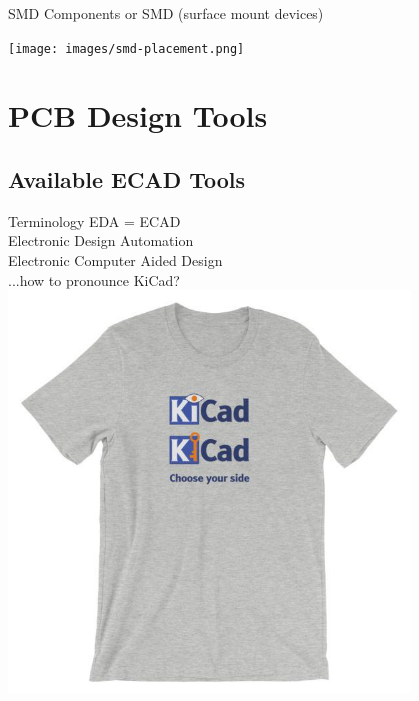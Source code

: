 \documentclass{beamer}
\begin{document}
\begin{frame}{SMD Components}
  or SMD (surface mount devices)\\
  \begin{center}
    \texttt{[image: images/smd-placement.png]}
  \end{center}
\end{frame}


\section{PCB Design Tools}

\subsection{Available ECAD Tools}

\begin{frame}{Terminology}
  EDA = ECAD\\
  Electronic Design Automation\\
  Electronic Computer Aided Design\\
  \pause
  \vspace{1cm}
  ...how to pronounce KiCad?\\
  \pause
  \includegraphics[width=0.8\textwidth]{images/kicad-pronounce.jpg}
\end{frame}
\end{document}
